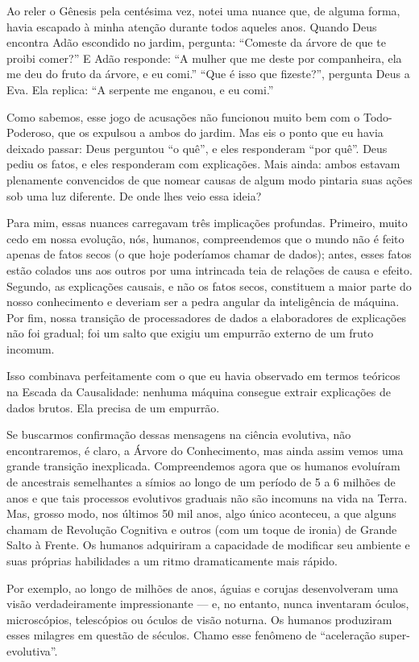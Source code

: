 \documentclass[11pt,a5paper,twoside]{book}
\begin{document}
Ao reler o Gênesis pela centésima vez, notei uma nuance que, de alguma forma, havia escapado à minha atenção durante todos aqueles anos. Quando Deus encontra Adão escondido no jardim, pergunta: “Comeste da árvore de que te proibi comer?” E Adão responde: “A mulher que me deste por companheira, ela me deu do fruto da árvore, e eu comi.” “Que é isso que fizeste?”, pergunta Deus a Eva. Ela replica: “A serpente me enganou, e eu comi.”

Como sabemos, esse jogo de acusações não funcionou muito bem com o Todo-Poderoso, que os expulsou a ambos do jardim. Mas eis o ponto que eu havia deixado passar: Deus perguntou “o quê”, e eles responderam “por quê”. Deus pediu os fatos, e eles responderam com explicações. Mais ainda: ambos estavam plenamente convencidos de que nomear causas de algum modo pintaria suas ações sob uma luz diferente. De onde lhes veio essa ideia?

Para mim, essas nuances carregavam três implicações profundas. Primeiro, muito cedo em nossa evolução, nós, humanos, compreendemos que o mundo não é feito apenas de fatos secos (o que hoje poderíamos chamar de dados); antes, esses fatos estão colados uns aos outros por uma intrincada teia de relações de causa e efeito. Segundo, as explicações causais, e não os fatos secos, constituem a maior parte do nosso conhecimento e deveriam ser a pedra angular da inteligência de máquina. Por fim, nossa transição de processadores de dados a elaboradores de explicações não foi gradual; foi um salto que exigiu um empurrão externo de um fruto incomum.

Isso combinava perfeitamente com o que eu havia observado em termos teóricos na Escada da Causalidade: nenhuma máquina consegue extrair explicações de dados brutos. Ela precisa de um empurrão.

Se buscarmos confirmação dessas mensagens na ciência evolutiva, não encontraremos, é claro, a Árvore do Conhecimento, mas ainda assim vemos uma grande transição inexplicada. Compreendemos agora que os humanos evoluíram de ancestrais semelhantes a símios ao longo de um período de 5 a 6 milhões de anos e que tais processos evolutivos graduais não são incomuns na vida na Terra. Mas, grosso modo, nos últimos 50 mil anos, algo único aconteceu, a que alguns chamam de Revolução Cognitiva e outros (com um toque de ironia) de Grande Salto à Frente. Os humanos adquiriram a capacidade de modificar seu ambiente e suas próprias habilidades a um ritmo dramaticamente mais rápido.

Por exemplo, ao longo de milhões de anos, águias e corujas desenvolveram uma visão verdadeiramente impressionante — e, no entanto, nunca inventaram óculos, microscópios, telescópios ou óculos de visão noturna. Os humanos produziram esses milagres em questão de séculos. Chamo esse fenômeno de “aceleração super-evolutiva”.
\end{document}
